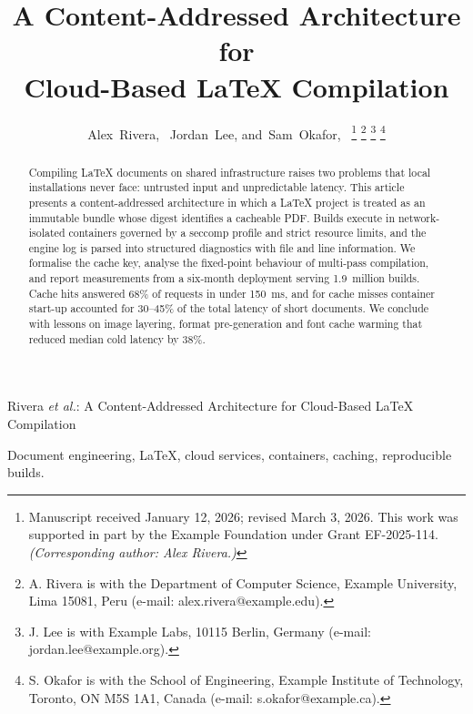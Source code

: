 \documentclass[journal]{IEEEtran}
\begin{document}
\title{A Content-Addressed Architecture for\\
Cloud-Based \LaTeX{} Compilation}

\author{Alex~Rivera,~
        Jordan~Lee,
        and~Sam~Okafor,~%
\thanks{Manuscript received January 12, 2026; revised March 3, 2026.
  This work was supported in part by the Example Foundation under Grant
  EF-2025-114. \textit{(Corresponding author: Alex Rivera.)}}%
\thanks{A. Rivera is with the Department of Computer Science, Example
  University, Lima 15081, Peru (e-mail: alex.rivera@example.edu).}%
\thanks{J. Lee is with Example Labs, 10115 Berlin, Germany
  (e-mail: jordan.lee@example.org).}%
\thanks{S. Okafor is with the School of Engineering, Example Institute of
  Technology, Toronto, ON M5S 1A1, Canada (e-mail: s.okafor@example.ca).}}

%
{Rivera \MakeLowercase{\textit{et al.}}: A Content-Addressed Architecture for Cloud-Based \LaTeX{} Compilation}

\maketitle

\begin{abstract}
Compiling \LaTeX{} documents on shared infrastructure raises two problems
that local installations never face: untrusted input and unpredictable
latency. This article presents a content-addressed architecture in which a
\LaTeX{} project is treated as an immutable bundle whose digest identifies a
cacheable PDF. Builds execute in network-isolated containers governed by a
seccomp profile and strict resource limits, and the engine log is parsed
into structured diagnostics with file and line information. We formalise the
cache key, analyse the fixed-point behaviour of multi-pass compilation, and
report measurements from a six-month deployment serving 1.9~million builds.
Cache hits answered 68\% of requests in under 150~ms, and for cache misses
container start-up accounted for 30--45\% of the total latency of short
documents. We conclude with lessons on image layering, format
pre-generation and font cache warming that reduced median cold latency by
38\%.
\end{abstract}

\begin{IEEEkeywords}
Document engineering, \LaTeX{}, cloud services, containers, caching,
reproducible builds.
\end{IEEEkeywords}
\end{document}
